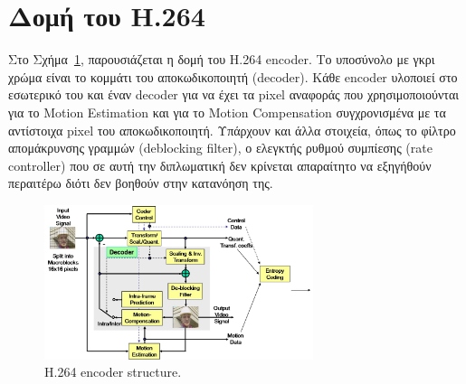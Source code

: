 \newpage

\section{Δομή του Η.264}
\label{section:sect28}

\indent Στο Σχήμα~\ref{fig:h264}, παρουσιάζεται η δομή του H.264 encoder. Το υποσύνολο με γκρι χρώμα είναι το κομμάτι του αποκωδικοποιητή (decoder). Κάθε encoder υλοποιεί στο εσωτερικό του και έναν decoder για να έχει τα pixel αναφοράς που χρησιμοποιούνται για το Motion Estimation και για το Motion Compensation συγχρονισμένα με τα αντίστοιχα pixel του αποκωδικοποιητή. Υπάρχουν και άλλα στοιχεία, όπως το φίλτρο απομάκρυνσης γραμμών (deblocking filter), ο ελεγκτής ρυθμού συμπίεσης (rate controller) που σε αυτή την διπλωματική δεν κρίνεται απαραίτητο να εξηγήθούν περαιτέρω διότι δεν βοηθούν στην κατανόηση της.

\begin{figure}[h]
    \centering
    \includegraphics[width=0.7\textwidth]{chapter2/h264.jpg}
    \caption{H.264 encoder structure. \cite{misc:structure}}
    \label{fig:h264}
\end{figure}
